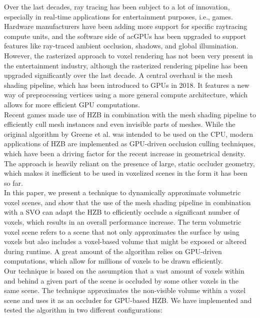 \documentclass[conference]{IEEEtran}
\begin{document}
\noindent
Over the last decades, ray tracing has been subject to a lot of innovation, especially in  
real-time applications for entertainment purposes, i.e., games. Hardware manufacturers have 
been adding more support for specific raytracing compute units, and the software side of 
ac{GPU}s has been upgraded to support features like ray-traced ambient occlusion, shadows, 
and global illumination. However, the rasterized approach to voxel rendering  has not been 
very present in the entertainment industry, although the rasterized rendering pipeline has 
been upgraded significantly over the last decade. A central overhaul is the mesh shading 
pipeline, which has been introduced to \ac{GPU}s in 2018. It features a new way of preprocessing 
vertices using a more general compute architecture, which allows for more efficient \ac{GPU} 
computations. \\

\noindent
Recent games made use of \ac{HZB} in combination with the mesh shading pipeline to efficiently 
cull mesh instances and even invisible parts of meshes. While the original algorithm by Greene 
et al. \cite{b1} was intended to be used on the \ac{CPU}, modern applications of \ac{HZB} are implemented 
as \ac{GPU}-driven occlusion culling techniques, which have been a driving factor for the recent increase 
in geometrical density. The approach is heavily reliant on the presence of large, static occluder 
geometry, which makes it inefficient to be used in voxelized scenes in the form it has been so far. \\

\noindent
In this paper, we present a technique to dynamically approximate volumetric voxel scenes, and show 
that the use of the mesh shading pipeline in combination with a \ac{SVO} can adapt the \ac{HZB} to 
efficiently occlude a significant number of voxels, which results in an overall performance increase.
The term volumetric voxel scene refers to a scene that not only approximates the surface by using 
voxels but also includes a voxel-based volume that might be exposed or altered during runtime. 
A great amount of the algorithm relies on \ac{GPU}-driven computations, which allow for millions of 
voxels to be drawn efficiently. \\

\noindent
Our technique is based on the assumption that a vast amount of voxels within and behind a given 
part of the scene is occluded by some other voxels in the same scene. The technique approximates 
the non-visible volume within a voxel scene and uses it as an occluder for \ac{GPU}-based \ac{HZB}. 
We have implemented and tested the algorithm in two different configurations:
\end{document}

